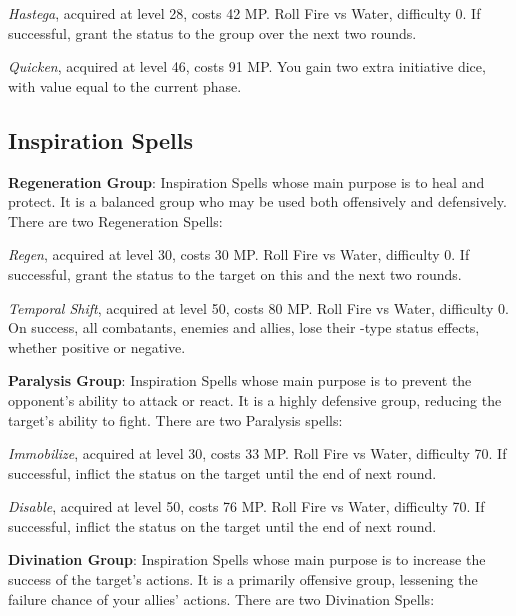 \begin{multicols}{2}
    \textit{Hastega}, acquired at level 28, costs 42 MP\@. Roll Fire vs Water, difficulty 0. If successful, grant the  status to the group over the next two rounds.
    
    \textit{Quicken}, acquired at level 46, costs 91 MP\@. You gain two extra initiative dice, with value equal to the current phase.
    
    \subsection{Inspiration Spells}\label{subsec:time-inspiration}

    \textbf{Regeneration Group}: Inspiration Spells whose main purpose is to heal and protect. It is a balanced group who may be used both offensively and defensively. There are two Regeneration Spells:
    
    \textit{Regen}, acquired at level 30, costs 30 MP\@. Roll Fire vs Water, difficulty 0. If successful, grant the  status to the target on this and the next two rounds.
    
    \textit{Temporal Shift}, acquired at level 50, costs 80 MP\@. Roll Fire vs Water, difficulty 0. On success, all combatants, enemies and allies, lose their -type status effects, whether positive or negative.
 
    \ffcrystal[type=level,height=8pt]
   
    \textbf{Paralysis Group}: Inspiration Spells whose main purpose is to prevent the opponent's ability to attack or react. It is a highly defensive group, reducing the target’s ability to fight. There are two Paralysis spells:
    
    \textit{Immobilize}, acquired at level 30, costs 33 MP\@. Roll Fire vs Water, difficulty 70. If successful, inflict the  status on the target until the end of next round.
    
    \textit{Disable}, acquired at level 50, costs 76 MP\@. Roll Fire vs Water, difficulty 70. If successful, inflict the  status on the target until the end of next round.
    
    \ffcrystal[type=level,height=8pt]

    \textbf{Divination Group}: Inspiration Spells whose main purpose is to increase the success of the target’s actions. It is a primarily offensive group, lessening the failure chance of your allies’ actions. There are two Divination Spells:
    

\end{multicols}
